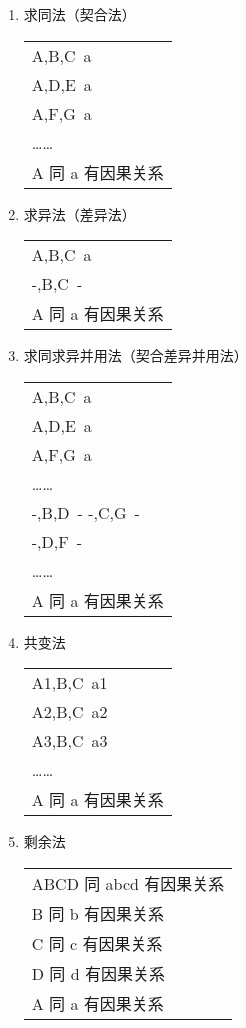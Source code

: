 \documentclass[12pt,onecolumn,a4paper]{book}
\numberwithin{table}{subsection}
\numberwithin{equation}{subsection}
\begin{document}
\begin{enumerate}
    \item 求同法（契合法）
    
    \begin{tabular}{l}
    A,B,C\ a\\
    A,D,E\ a\\
    A,F,G\ a\\
    ……\\
    \hline
    A 同 a 有因果关系\\
    \end{tabular}
    \item 求异法（差异法）
    
    \begin{tabular}{l}
    A,B,C\ a\\
    -,B,C\ -\\
    \hline
    A 同 a 有因果关系\\
    \end{tabular}   
    \item 求同求异并用法（契合差异并用法）
    
    \begin{tabular}{l}
    A,B,C\ a \\
    A,D,E\ a\\
    A,F,G\ a\\
    ……\\
    -,B,D\ -
    -,C,G\ -\\
    -,D,F\ -\\
    ……\\
    \hline
    A 同 a 有因果关系\\
    \end{tabular}  
    \item 共变法
    
    \begin{tabular}{l}
    A1,B,C\ a1\\
    A2,B,C\ a2\\
    A3,B,C\ a3\\
    ……\\
    \hline
    A 同 a 有因果关系\\
    \end{tabular}  
    \item 剩余法
    
    \begin{tabular}{l}
    ABCD 同 abcd 有因果关系\\
    B 同 b 有因果关系\\
    C 同 c 有因果关系\\
    D 同 d 有因果关系\\
    \hline
    A 同 a 有因果关系\\
    \end{tabular}  
\end{enumerate}
\end{document}
